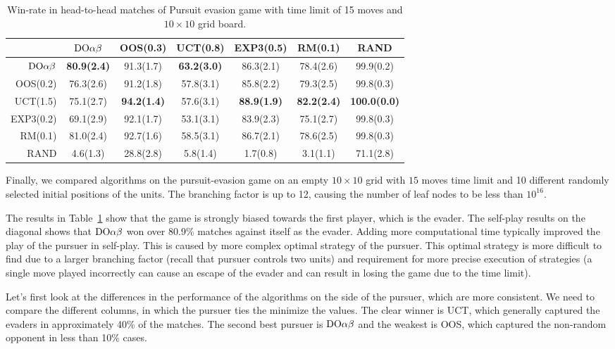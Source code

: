 \begin{table}
\centering
\begin{scriptsize}

\begin{tabular}{|r|cccccc|}\hline
&$\textrm{DO}\alpha\beta$&OOS(0.3)&UCT(0.8)&EXP3(0.5)&RM(0.1)&RAND\\\hline
$\textrm{DO}\alpha\beta$& \textbf{80.9(2.4)}& 91.3(1.7)& \textbf{63.2(3.0)}& 86.3(2.1)& 78.4(2.6)& 99.9(0.2)\\
OOS(0.2)& 76.3(2.6)& 91.2(1.8)& 57.8(3.1)& 85.8(2.2)& 79.3(2.5)& 99.8(0.3)\\
UCT(1.5)& 75.1(2.7)& \textbf{94.2(1.4)}& 57.6(3.1)& \textbf{88.9(1.9)}& \textbf{82.2(2.4)}& \textbf{100.0(0.0)}\\
EXP3(0.2)& 69.1(2.9)& 92.1(1.7)& 53.1(3.1)& 83.9(2.3)& 75.1(2.7)& 99.8(0.3)\\
RM(0.1)& 81.0(2.4)& 92.7(1.6)& 58.5(3.1)& 86.7(2.1)& 78.6(2.5)& 99.8(0.3)\\
RAND& 4.6(1.3)& 28.8(2.8)& 5.8(1.4)& 1.7(0.8)& 3.1(1.1)& 71.1(2.8)\\
\hline
\end{tabular}

\end{scriptsize}
\caption{Win-rate in head-to-head matches of Pursuit evasion game with time limit of 15 moves and $10\times 10$ grid board.}\label{fig:matches:peg}
\end{table}


Finally, we compared algorithms on the pursuit-evasion game on an empty $10\times 10$ grid with $15$ moves time limit and 10 different randomly selected initial positions of the units. The branching factor is up to 12, causing the number of leaf nodes to be less than $10^{16}$.

The results in Table~\ref{fig:matches:peg} show that the game is strongly biased towards the first player, which is the evader. The self-play results on the diagonal shows that $\textrm{DO}\alpha\beta$ won over 80.9\% matches against itself as the evader. Adding more computational time typically improved the play of the pursuer in self-play. This is caused by more complex optimal strategy of the pursuer. This optimal strategy is more difficult to find due to a larger branching factor (recall that pursuer controls two units) and requirement for more precise execution of strategies (a single move played incorrectly can cause an escape of the evader and can result in losing the game due to the time limit).

Let's first look at the differences in the performance of the algorithms on the side of the pursuer, which are more consistent. We need to compare the different columns, in which the pursuer ties the minimize the values.
The clear winner is UCT, which generally captured the evaders in approximately 40\% of the matches.
The second best pursuer is $\textrm{DO}\alpha\beta$ and the weakest is OOS, which captured the non-random opponent in less than 10\% cases.

